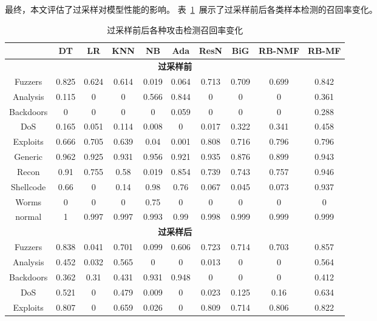 最终，本文评估了过采样对模型性能的影响。
表~\ref{tab:model_performance_oversampling}~展示了过采样前后各类样本检测的召回率变化。
\begin{table}[htbp]
	\centering
	\caption{过采样前后各种攻击检测召回率变化}
	\label{tab:model_performance_oversampling}
	\begin{tabular}{cccccccccc}
		\toprule
		          & DT    & LR    & KNN   & NB    & Ada   & ResN  & BiG   & RB-NMF & RB-MF \\
		\midrule
		\multicolumn{10}{c}{\textbf{过采样前}}                                             \\
		Fuzzers   & 0.825 & 0.624 & 0.614 & 0.019 & 0.064 & 0.713 & 0.709 & 0.699  & 0.842 \\
		Analysis  & 0.115 & 0     & 0     & 0.566 & 0.844 & 0     & 0     & 0      & 0.361 \\
		Backdoors & 0     & 0     & 0     & 0     & 0.059 & 0     & 0     & 0      & 0.288 \\
		DoS       & 0.165 & 0.051 & 0.114 & 0.008 & 0     & 0.017 & 0.322 & 0.341  & 0.458 \\
		Exploits  & 0.666 & 0.705 & 0.639 & 0.04  & 0.001 & 0.808 & 0.716 & 0.796  & 0.796 \\
		Generic   & 0.962 & 0.925 & 0.931 & 0.956 & 0.921 & 0.935 & 0.876 & 0.899  & 0.943 \\
		Recon     & 0.91  & 0.755 & 0.58  & 0.019 & 0.854 & 0.739 & 0.743 & 0.757  & 0.946 \\
		Shellcode & 0.66  & 0     & 0.14  & 0.98  & 0.76  & 0.067 & 0.045 & 0.073  & 0.937 \\
		Worms     & 0     & 0     & 0     & 0.75  & 0     & 0     & 0     & 0      & 0     \\
		normal    & 1     & 0.997 & 0.997 & 0.993 & 0.99  & 0.998 & 0.999 & 0.999  & 0.999 \\
		\midrule
		\multicolumn{10}{c}{\textbf{过采样后}}                                             \\
		Fuzzers   & 0.838 & 0.041 & 0.701 & 0.099 & 0.606 & 0.723 & 0.714 & 0.703  & 0.857 \\
		Analysis  & 0.452 & 0.032 & 0.565 & 0     & 0     & 0.013 & 0     & 0      & 0.564 \\
		Backdoors & 0.362 & 0.31  & 0.431 & 0.931 & 0.948 & 0     & 0     & 0      & 0.412 \\
		DoS       & 0.521 & 0     & 0.479 & 0.009 & 0     & 0.023 & 0.125 & 0.16   & 0.634 \\
		Exploits  & 0.807 & 0     & 0.659 & 0.026 & 0     & 0.809 & 0.714 & 0.806  & 0.822 \\

\end{tabular}
\end{table}
